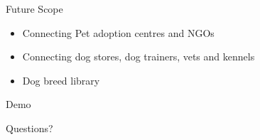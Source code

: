 \documentclass[14pt]{beamer}
\begin{document}
\begin{frame}{Future Scope}
    \begin{itemize}
        \item Connecting Pet adoption centres and NGOs
        \item Connecting dog stores, dog trainers, vets and kennels 
        \item Dog breed library
    \end{itemize}
\end{frame}

\begin{frame}[standout]
    Demo
\end{frame}

\begin{frame}[standout]
    Questions?
\end{frame}
\end{document}
